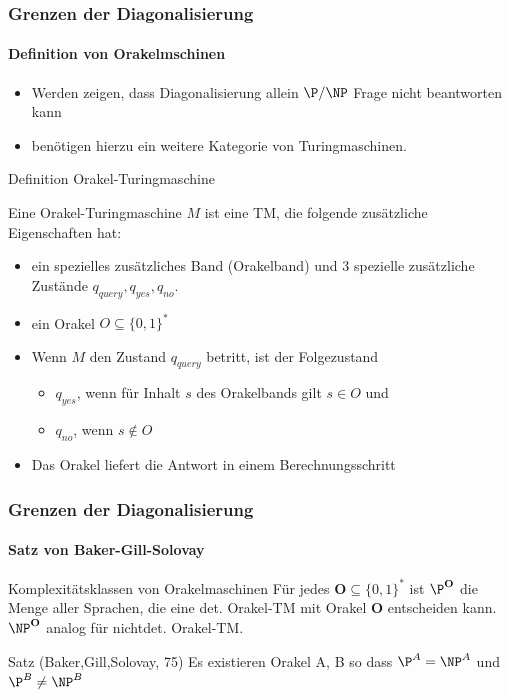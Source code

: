 \begin{frame}
	\frametitle{Grenzen der Diagonalisierung}
	\framesubtitle{Definition von Orakelmschinen}
	\begin{itemize}
		\item Werden zeigen, dass Diagonalisierung allein $\P/\NP$ Frage nicht beantworten kann
		\item benötigen hierzu ein weitere Kategorie von Turingmaschinen. 
	\end{itemize}
	\begin{KITinfoblock}{Definition Orakel-Turingmaschine} {
			Eine Orakel-Turingmaschine $M$ ist eine TM, die folgende zusätzliche Eigenschaften hat:
			\begin{itemize}
				\item<2-> ein spezielles zusätzliches Band (Orakelband) und 3 spezielle zusätzliche Zustände $q_{query}, q_{yes}, q_{no}$.
				\item <3-> ein Orakel $O \subseteq \{0,1\}^*$
				\item <4-> Wenn $M$ den Zustand $q_{query}$ betritt, ist der Folgezustand
					\begin{itemize}
					\item $q_{yes}$, wenn für Inhalt $s$ des Orakelbands gilt $s \in O$ und
				    \item	$q_{no}$, wenn  $s \notin O$ 
					\end{itemize} 
				\item<5-> Das Orakel liefert die Antwort \alert{in einem Berechnungsschritt}
			\end{itemize}
		}
	\end{KITinfoblock}
\end{frame}
\begin{frame} 
	\frametitle{Grenzen der Diagonalisierung}
	\framesubtitle{Satz von Baker-Gill-Solovay}
	\begin{KITinfoblock}{Komplexitätsklassen von Orakelmaschinen}
		Für jedes $\mathbf{O} \subseteq \{0,1\}^*$ ist ${\P}^{\mathbf{O}}$ die Menge
		aller Sprachen, die eine det. Orakel-TM mit Orakel $\mathbf{O}$ entscheiden
		kann.
		${\NP}^{\mathbf{O}}$ analog für nichtdet. Orakel-TM.
		
	\end{KITinfoblock}
	\bigskip
	\pause
	\begin{KITinfoblock}{Satz (Baker,Gill,Solovay, 75)}
		Es existieren Orakel A, B so dass ${\P}^A = {\NP}^A$ und ${\P}^B \neq {\NP}^B$
	\end{KITinfoblock}
	
\end{frame}
